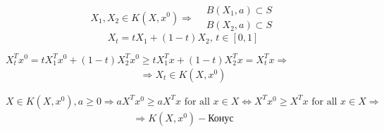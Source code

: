 \documentclass[a5paper,twoside,russian]{article}
\begin{document}
\begin{enumerate}[label=\textbf{Задача \arabic*.}]
    \begin{prf}
        \[
        X_1, X_2 \in K(X, x^0) \Rightarrow
        \begin{aligned}
            & B(X_1, a) \subset S \\
            & B(X_2, a) \subset S
        \end{aligned}
        \]
        \[
        X_t = tX_1 + (1-t)X_2, \, t \in [0, 1]
        \]

        $X_t^T x^0 = t X_1^T x^0 + (1-t) X_2^T x^0 \geq t X_1^T x + (1-t) X_2^T x = X_t^T x \Rightarrow$
        \[
        \begin{aligned}
            \Rightarrow X_t \in K(X, x^0)
        \end{aligned}
        \]

        $X \in K(X, x^0), a \geq 0 \Rightarrow aX^T x^0 \geq a X^T x \text{ for all } x \in X \Leftrightarrow X^T x^0 \geq X^T x \text{ for all } x \in X \Rightarrow$
        \[
        \begin{aligned}
            \Rightarrow K(X, x^0) - \text{Конус}
        \end{aligned}
        \]
    \end{prf}
\end{enumerate}
\end{document}
